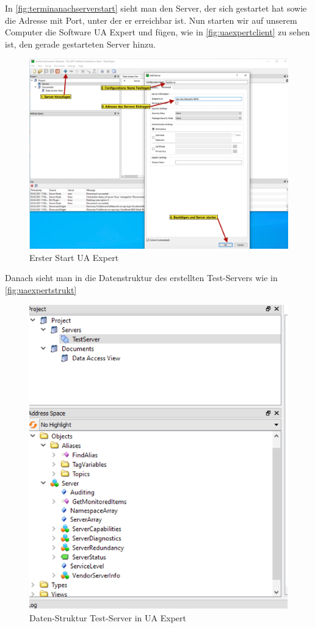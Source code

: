 In \autoref{fig:terminanachserverstart} sieht man den Server, der sich gestartet hat sowie die Adresse mit Port, unter der er erreichbar ist. Nun starten wir auf unserem Computer die Software UA Expert und fügen, wie in \autoref{fig:uaexpertclient} zu sehen ist, den gerade gestarteten Server hinzu. 

\begin{figure}[H]
	\centering
	\includegraphics[width=1\linewidth]{abb/UA_ExpertClient}
	\caption{Erster Start UA Expert}
	\label{fig:uaexpertclient}
\end{figure}

Danach sieht man in  die Datenstruktur des erstellten Test-Servers wie in \autoref{fig:uaexpertstrukt}

\begin{figure}[H]
	\centering
	\includegraphics[width=0.6\linewidth]{abb/UA_Expert_Strukt}
	\caption{Daten-Struktur Test-Server in UA Expert}
	\label{fig:uaexpertstrukt}
\end{figure}
\clearpage
